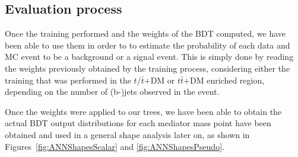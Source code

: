 \documentclass[a4paper, 10pt, openright]{report}
\begin{document}

\subsection{Evaluation process}

Once the training performed and the weights of the \ac{BDT} computed, we have been able to use them in order to to estimate the probability of each data and \ac{MC} event to be a background or a signal event. This is simply done by reading the weights previously obtained by the training process, considering either the training that was performed in the $t/\bar t$+DM or $t \bar t$+DM enriched region, depending on the number of (b-)jets observed in the event.

Once the weights were applied to our trees, we have been able to obtain the actual \ac{BDT} output distributions for each mediator mass point have been obtained and used in a general shape analysis later on, as shown in Figures~\ref{fig:ANNShapesScalar} and \ref{fig:ANNShapesPseudo}.

\end{document}
